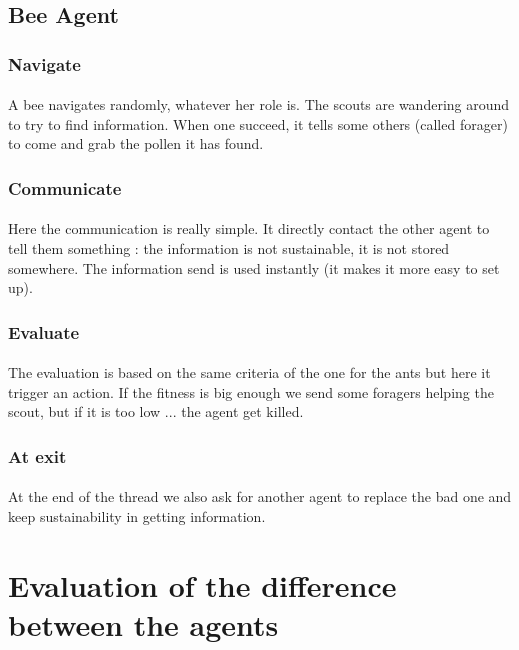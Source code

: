 \documentclass{article}
\begin{document}
	\subsection{Bee Agent}
		\subsubsection{Navigate}
			\paragraph{}
			A bee navigates randomly, whatever her role is.
			The scouts are wandering around to try to find information.
			When one succeed, it tells some others (called forager) to come and grab the pollen it has found.
		\subsubsection{Communicate}
			\paragraph{}
			Here the communication is really simple.
			It directly contact the other agent to tell them something : the information is not sustainable, it is not stored somewhere.
			The information send is used instantly (it makes it more easy to set up).
		\subsubsection{Evaluate}
			\paragraph{}
			The evaluation is based on the same criteria of the one for the ants but here it trigger an action.
			If the fitness is big enough we send some foragers helping the scout, but if it is too low ... the agent get killed.
		\subsubsection{At exit}
			\paragraph{}
			At the end of the thread we also ask for another agent to replace the bad one and keep sustainability in getting information.
			
\section{Evaluation of the difference between the agents}
\end{document}
